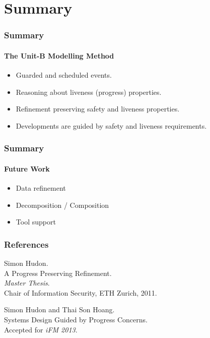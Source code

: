 \section{Summary}
\label{sec:summary}

\begin{frame}
  \frametitle{Summary}
  \framesubtitle{The Unit-B Modelling Method}

  \begin{itemize}
  \item Guarded and \alert{scheduled} events.
    \medskip
  \item Reasoning about \alert{liveness (progress) properties}.
    \medskip
  \item \alert{Refinement} preserving safety and liveness properties.
    \medskip
  \item Developments are \alert{guided by safety and liveness requirements}.
  \end{itemize}
\end{frame}

\begin{frame}
  \frametitle{Summary}
  \framesubtitle{Future Work}

  \begin{itemize}
  \item Data refinement
    \medskip
  \item Decomposition / Composition
    \medskip
  \item Tool support
  \end{itemize}
\end{frame}

\begin{frame}[allowframebreaks]
  \frametitle{References}
  
  \begin{thebibliography}{10}
    
    \beamertemplatebookbibitems
    Simon Hudon.\\
    A Progress Preserving Refinement.\\
    \emph{Master Thesis}.\\
    Chair of Information Security, ETH Zurich, 2011.
    
    \beamertemplatearticlebibitems
    
    Simon Hudon and Thai Son Hoang.\\
    Systems Design Guided by Progress Concerns.\\
    Accepted for \emph{iFM 2013}.
    
  \end{thebibliography}
\end{frame}




